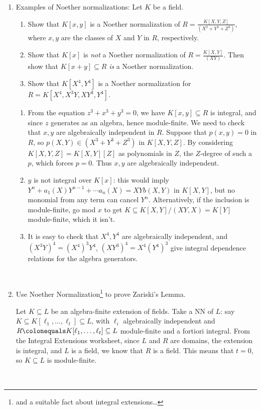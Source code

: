 \documentclass[12pt]{amsart}
\newcommand{\Bold}[1]{\contour{black}{#1}}
\newcommand{\1}{\mathbbm{1}}
\newcommand{\ds}{\displaystyle}
\newcommand{\solution}[1]{\ifthenelse {\equal{\displaysol}{1}} {\begin{framed}{\color{meretale}\noindent #1}\end{framed}} { \ }}
\newcommand\itemA{\stepcounter{enumi}\item[{\Bold{(\theenumi)}}]}
\newcommand\itema{\stepcounter{enumii}\item[{\Bold{(\theenumii)}}]}
\newcommand\ceq{\colonequals}
\begin{document}

 
\begin{enumerate}
\itemA Examples of Noether normalizations: Let $K$ be a field.
\begin{enumerate}
\itema Show that $K[x,y]$ is a Noether normalization of $\ds R= \frac{K[X,Y,Z]}{(X^3+Y^3+Z^3)}$, where $x,y$ are the classes of $X$ and $Y$ in $R$, respectively.
\itema Show that $K[x]$ is \emph{not} a Noether normalization of $\ds R=\frac{K[X,Y]}{(XY)}$. Then show that ${K[x+y] \subseteq R}$ \emph{is} a Noether normalization.
\itema Show that $K[X^4,Y^4]$ is a  Noether normalization for  $R=K[X^4,X^3Y,XY^3,Y^4]$.
\end{enumerate}

\solution{
\begin{enumerate}
\itema From the equation $z^3 +x^3+y^3 = 0$, we have $K[x,y]\subseteq R$ is integral, and since $z$ generates as an algebra, hence module-finite. We need to check that $x,y$ are algebraically independent in $R$. Suppose that $p(x,y)=0$ in $R$, so $p(X,Y) \in (X^3 + Y^3 + Z^3)$ in $K[X,Y,Z]$. By considering $K[X,Y,Z]=K[X,Y][Z]$ as polynomials in $Z$, the $Z$-degree of such a $p$, which forces $p=0$. Thus $x,y$ are algebraically independent.
\itema $y$ is not integral over $K[x]$: this would imply $Y^n + a_1(X) Y^{n-1} + \cdots a_n(X) = XY b(X,Y)$ in $K[X,Y]$, but no monomial from any term can cancel $Y^n$. Alternatively, if the inclusion is module-finite, go mod $x$ to get $K \subseteq K[X,Y]/(XY,X) = K[Y]$ module-finite, which it isn't.
\itema It is easy to check that $X^4, Y^4$ are algebraically independent, and $(X^3Y)^4 = (X^4)^3 Y^4$, $(XY^3)^4 = X^4 (Y^4)^3$ give integral dependence relations for the algebra generators.
\end{enumerate}}

\itemA Use Noether Normalization\footnote{and a suitable fact about integral extensions\dots} to prove Zariski's Lemma.

\solution{Let $K\subseteq L$ be an algebra-finite extension of fields. Take a NN of $L$: say ${K \subseteq K[\ell_1,\dots, \ell_t] \subseteq L}$, with $\ell_i$ algebraically independent and $R\ceq K[\ell_1,\dots, \ell_t] \subseteq L$ module-finite and a fortiori integral. From the Integral Extensions worksheet, since $L$ and $R$ are domains, the extension is integral, and $L$ is a field, we know that $R$ is a field. This means that $t=0$, so $K\subseteq L$ is module-finite.}


\end{enumerate}
\end{document}
